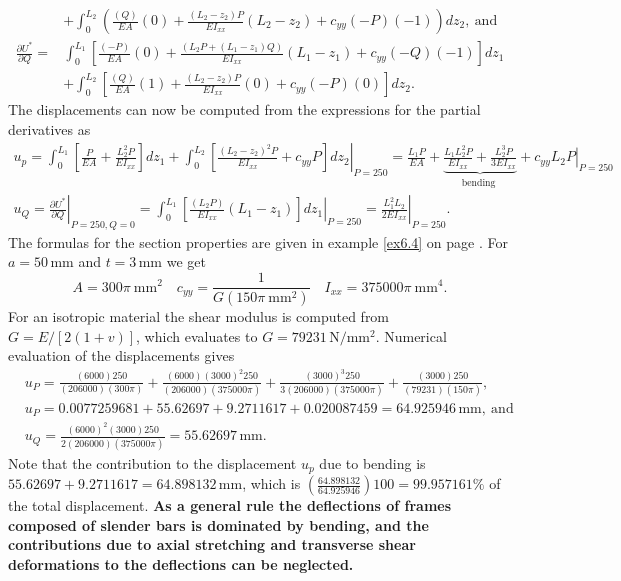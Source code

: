 \documentclass{AeroStructure-ERJohnson}
\begin{document}
\begin{example}
\begin{align*}
& + \int_{0}^{L_{2}}\left(\frac{(Q)}{E A}(0)+\frac{\left(L_{2}-z_{2}\right) P}{E I_{x x}}\left(L_{2}-z_{2}\right)+c_{y y}(-P)(-1)\right) d z_{2},\ \text{and}\tag{g}\\
\frac{\partial U^{*}}{\partial Q}=&\int_{0}^{L_{1}} \left[\frac{(-P)}{E A}(0)+\frac{\left(L_{2} P+\left(L_{1}-z_{1}\right) Q\right)}{E I_{x x}}\left(L_{1}-z_{1}\right)+c_{y y}(-Q)(-1)\right] d z_{1} \\
&+ \int_{0}^{L_{2}}\left[\frac{(Q)}{E A}(1)+\frac{\left(L_{2}-z_{2}\right) P}{E I_{x x}}(0)+c_{y y}(-P)(0)\right] d z_{2}.\tag{h}
\end{align*}
The displacements can now be computed from the expressions for the partial derivatives as
\begin{gather*}
u_{p}=\int_{0}^{L_{1}}\left[\frac{P}{E A}+\frac{L_{2}^{2} P}{E I_{x x}}\right] d z_{1}+\left.\int_{0}^{L_{2}}\left[\frac{\left(L_{2}-z_{2}\right)^{2} P}{E I_{x x}}+c_{y y} P\right] d z_{2}\right|_{P=250}=\frac{L_{1} P}{E A}+\underbrace{\frac{L_{1} L_{2}^{2} P}{E I_{x x}}+\frac{L_{2}^{3} P}{3 E I_{x x}}}_{\text {bending }}+\left.c_{y y} L_{2} P\right|_{P=250}\tag{i}\\
u_{Q}=\left.\frac{\partial U^{*}}{\partial Q}\right|_{P=250, Q=0}=\left.\int_{0}^{L_{1}}\left[\frac{\left(L_{2} P\right)}{E I_{x x}}\left(L_{1}-z_{1}\right)\right] d z_{1}\right|_{P=250}=\left.\frac{L_{1}^{2} L_{2}}{2 E I_{x x}}\right|_{P=250}.\tag{j}
\end{gather*}
The formulas for the section properties are given in example \ref{ex6.4} on page \pageref{ex6.4}. For $a=50\,\mathrm{mm}$ and $t=3\,\mathrm{mm}$ we get
\begin{equation*}
A=300 \pi~\mathrm{mm}^{2} \quad c_{y y}=\frac{1}{G\left(150 \pi~\mathrm{mm}^{2}\right)} \quad I_{x x}=375000 \pi~\mathrm{mm}^{4}.\tag{k}
\end{equation*}
For an isotropic material the shear modulus is computed from $G=E /[2(1+v)]$, which evaluates to $G=79231\,\mathrm{N} / \mathrm{mm}^{2}$. Numerical evaluation of the displacements gives
\begin{align*}
&u_{P}=\frac{(6000) 250}{(206000)(300 \pi)}+\frac{(6000)(3000)^{2} 250}{(206000)(375000 \pi)}+\frac{(3000)^{3} 250}{3(206000)(375000 \pi)}+\frac{(3000) 250}{(79231)(150 \pi)},\tag{l}\\
&u_{P}=0.0077259681+55.62697+9.2711617+0.020087459=64.925946\,\mathrm{mm},\ \mbox{and}\tag{m}\\
&u_{Q}=\frac{(6000)^{2}(3000) 250}{2(206000)(375000 \pi)}=55.62697\,\mathrm{mm}.\tag{n}
\end{align*}
Note that the contribution to the displacement $u_{p}$ due to bending is $55.62697+9.2711617=64.898132\,\mathrm{mm}$, which is $\left(\frac{64.898132}{64.925946}\right) 100=99.957161 \%$ of the total displacement. \textbf{As a general rule the deflections of frames composed of slender bars is dominated by bending, and the contributions due to axial stretching and transverse shear deformations to the deflections can be neglected.}
\end{example}
\end{document}
